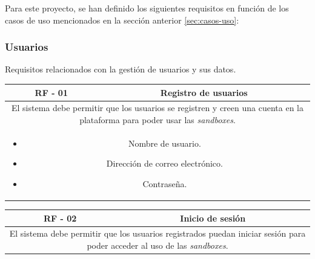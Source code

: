             Para este proyecto, se han definido los siguientes requisitos en función de los casos de uso mencionados en la sección anterior \ref{sec:casos-uso}:
            
            
            \subsubsection{Usuarios}
            
                Requisitos relacionados con la gestión de usuarios y sus datos.
                
                \begin{table}[!htbp]
                    \centering
                    \begin{tabular}{|c|c|}
                        \hline
                        \textbf{RF - 01} & \textbf{Registro de usuarios} \\
                        \hline
                        \multicolumn{2}{|p{15cm}|}{
                            El sistema debe permitir que los usuarios se registren y creen una cuenta en la plataforma para poder usar las \textit{sandboxes}.
                        } \\
                        \hline
                        \multicolumn{2}{|p{15cm}|}{
                            \begin{itemize}
                                \item Nombre de usuario.
                                \item Dirección de correo electrónico.
                                \item Contraseña.
                            \end{itemize}
                            } \\
                        \hline
                    \end{tabular}
                    \label{tab:RF1}
                \end{table}
                
                \begin{table}[!htbp]
                    \centering
                    \begin{tabular}{|c|c|}
                        \hline
                        \textbf{RF - 02} & \textbf{Inicio de sesión} \\
                        \hline
                        \multicolumn{2}{|p{15cm}|}{
                            El sistema debe permitir que los usuarios registrados puedan iniciar sesión para poder acceder al uso de las \textit{sandboxes}.
                        } \\
                        \hline
                    \end{tabular}
                    \label{tab:RF2}
                \end{table}
                
